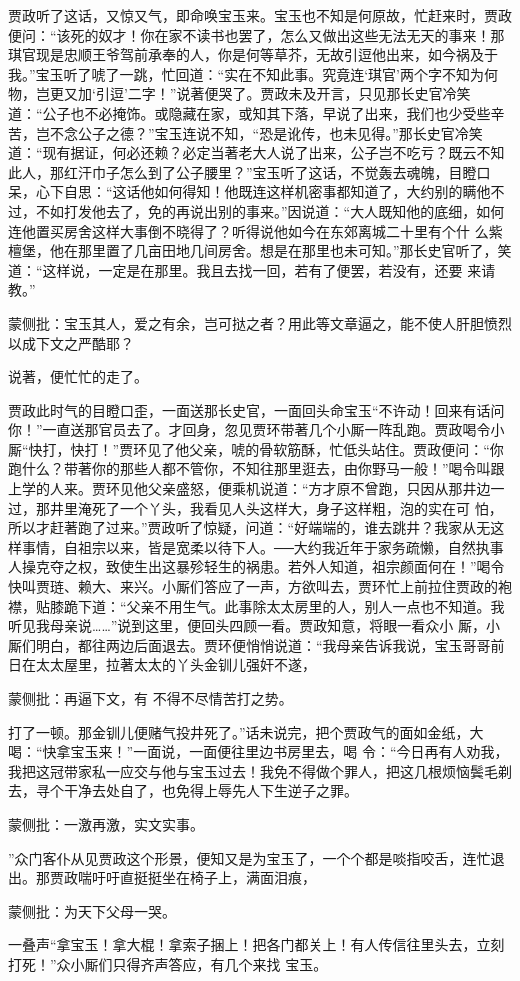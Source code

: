 \begin{parag}
    贾政听了这话，又惊又气，即命唤宝玉来。宝玉也不知是何原故，忙赶来时，贾政便问：“该死的奴才！你在家不读书也罢了，怎么又做出这些无法无天的事来！那琪官现是忠顺王爷驾前承奉的人，你是何等草芥，无故引逗他出来，如今祸及于我。”宝玉听了唬了一跳，忙回道：“实在不知此事。究竟连‘琪官’两个字不知为何物，岂更又加‘引逗’二字！”说著便哭了。贾政未及开言，只见那长史官冷笑道：“公子也不必掩饰。或隐藏在家，或知其下落，早说了出来，我们也少受些辛苦，岂不念公子之德？”宝玉连说不知，“恐是讹传，也未见得。”那长史官冷笑道：“现有据证，何必还赖？必定当著老大人说了出来，公子岂不吃亏？既云不知此人，那红汗巾子怎么到了公子腰里？”宝玉听了这话，不觉轰去魂魄，目瞪口呆，心下自思：“这话他如何得知！他既连这样机密事都知道了，大约别的瞒他不过，不如打发他去了，免的再说出别的事来。”因说道：“大人既知他的底细，如何连他置买房舍这样大事倒不晓得了？听得说他如今在东郊离城二十里有个什 么紫檀堡，他在那里置了几亩田地几间房舍。想是在那里也未可知。”那长史官听了，笑道：“这样说，一定是在那里。我且去找一回，若有了便罢，若没有，还要 来请教。”\begin{note}蒙侧批：宝玉其人，爱之有余，岂可挞之者？用此等文章逼之，能不使人肝胆愤烈以成下文之严酷耶？\end{note}说著，便忙忙的走了。
\end{parag}


\begin{parag}
    贾政此时气的目瞪口歪，一面送那长史官，一面回头命宝玉“不许动！回来有话问你！”一直送那官员去了。才回身，忽见贾环带著几个小厮一阵乱跑。贾政喝令小厮“快打，快打！”贾环见了他父亲，唬的骨软筋酥，忙低头站住。贾政便问：“你跑什么？带著你的那些人都不管你，不知往那里逛去，由你野马一般！”喝令叫跟上学的人来。贾环见他父亲盛怒，便乘机说道：“方才原不曾跑，只因从那井边一过，那井里淹死了一个丫头，我看见人头这样大，身子这样粗，泡的实在可 怕，所以才赶著跑了过来。”贾政听了惊疑，问道：“好端端的，谁去跳井？我家从无这样事情，自祖宗以来，皆是宽柔以待下人。──大约我近年于家务疏懒，自然执事人操克夺之权，致使生出这暴殄轻生的祸患。若外人知道，祖宗颜面何在！”喝令快叫贾琏、赖大、来兴。小厮们答应了一声，方欲叫去，贾环忙上前拉住贾政的袍襟，贴膝跪下道：“父亲不用生气。此事除太太房里的人，别人一点也不知道。我听见我母亲说……”说到这里，便回头四顾一看。贾政知意，将眼一看众小 厮，小厮们明白，都往两边后面退去。贾环便悄悄说道：“我母亲告诉我说，宝玉哥哥前日在太太屋里，拉著太太的丫头金钏儿强奸不遂，\begin{note}蒙侧批：再逼下文，有 不得不尽情苦打之势。\end{note}打了一顿。那金钏儿便赌气投井死了。”话未说完，把个贾政气的面如金纸，大喝：“快拿宝玉来！”一面说，一面便往里边书房里去，喝 令：“今日再有人劝我，我把这冠带家私一应交与他与宝玉过去！我免不得做个罪人，把这几根烦恼鬓毛剃去，寻个干净去处自了，也免得上辱先人下生逆子之罪。\begin{note}蒙侧批：一激再激，实文实事。\end{note}”众门客仆从见贾政这个形景，便知又是为宝玉了，一个个都是啖指咬舌，连忙退出。那贾政喘吁吁直挺挺坐在椅子上，满面泪痕，\begin{note}蒙侧批：为天下父母一哭。\end{note}一叠声“拿宝玉！拿大棍！拿索子捆上！把各门都关上！有人传信往里头去，立刻打死！”众小厮们只得齐声答应，有几个来找 宝玉。
\end{parag}


